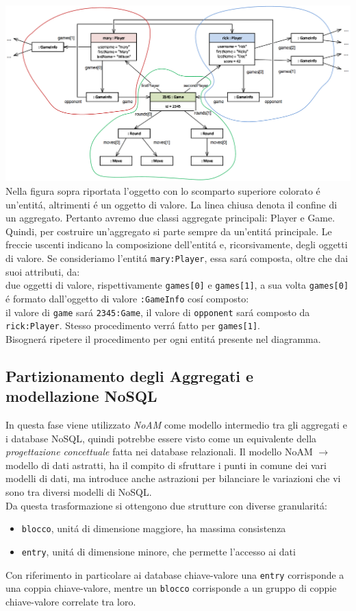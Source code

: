 \includegraphics[width=1.05\textwidth]{img/designAggregati}
Nella figura sopra riportata l'oggetto con lo scomparto superiore colorato é un'entitá, altrimenti
é un oggetto di valore. La linea chiusa denota il confine di un aggregato.
Pertanto avremo due classi aggregate principali: Player e Game.\\
Quindi, per costruire un'aggregato si parte sempre da un'entitá principale.
Le freccie uscenti indicano la composizione dell'entitá e, ricorsivamente, degli oggetti di valore.
Se consideriamo l'entitá \texttt{mary:Player}, essa sará composta, oltre che dai suoi attributi, da:\\
due oggetti di valore, rispettivamente \texttt{games[0]} e \texttt{games[1]}, a sua volta \texttt{games[0]} é formato dall'oggetto
di valore \texttt{:GameInfo} cosí composto:\\
il valore di \texttt{game} sará \texttt{2345:Game}, il valore di \texttt{opponent} sará composto da \texttt{rick:Player}.
Stesso procedimento verrá fatto per \texttt{games[1]}.\\
Bisognerá ripetere il procedimento per ogni entitá presente nel diagramma.


\subsection{Partizionamento degli Aggregati e modellazione NoSQL}
In questa fase viene utilizzato \emph{NoAM} come modello intermedio tra gli aggregati e i database NoSQL, quindi potrebbe
essere visto come un equivalente della \emph{progettazione concettuale} fatta nei database relazionali.
Il modello NoAM $\to$ modello di dati astratti, ha il compito di sfruttare i punti in comune dei vari modelli di dati, ma
introduce anche astrazioni per bilanciare le variazioni che vi sono tra diversi modelli di NoSQL.\\
Da questa trasformazione si ottengono due strutture con diverse granularitá:\\
\begin{itemize}
    \item \texttt{blocco}, unitá di dimensione maggiore, ha massima consistenza
    \item \texttt{entry}, unitá di dimensione minore, che permette l'accesso ai dati
\end{itemize}
Con riferimento in particolare ai database chiave-valore una \texttt{entry} corrisponde a una coppia chiave-valore, mentre
un \texttt{blocco} corrisponde a un gruppo di coppie chiave-valore correlate tra loro.

